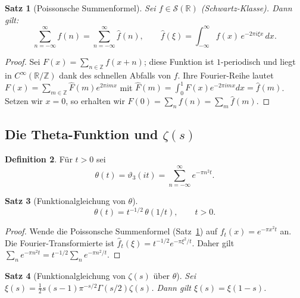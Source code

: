 \documentclass[12pt,a4paper]{amsart}
\newtheorem{theorem}{Satz}[section]
\theoremstyle{definition}
\newtheorem{definition}[theorem]{Definition}
\begin{document}
\begin{theorem}[Poissonsche Summenformel]\label{thm:poisson}
Sei $f \in \mathcal{S}(\mathbb{R})$ (Schwartz-Klasse). Dann gilt:
\[
  \sum_{n=-\infty}^{\infty} f(n) = \sum_{n=-\infty}^{\infty} \hat{f}(n),
  \qquad \hat{f}(\xi) = \int_{-\infty}^{\infty} f(x)\, e^{-2\pi i \xi x}\,dx.
\]
\end{theorem}

\begin{proof}
Sei $F(x) = \sum_{n\in\mathbb{Z}} f(x+n)$; diese Funktion ist $1$-periodisch
und liegt in $C^\infty(\mathbb{R}/\mathbb{Z})$ dank des schnellen Abfalls von $f$.
Ihre Fourier-Reihe lautet $F(x) = \sum_{m\in\mathbb{Z}} \hat{F}(m) e^{2\pi imx}$ mit
$\hat{F}(m) = \int_0^1 F(x) e^{-2\pi imx}dx = \hat{f}(m)$.
Setzen wir $x = 0$, so erhalten wir $F(0) = \sum_n f(n) = \sum_m \hat{f}(m)$.
\end{proof}

\subsection{Die Theta-Funktion und $\zeta(s)$}

\begin{definition}
Für $t > 0$ sei
\[
  \theta(t) = \vartheta_3(it) = \sum_{n=-\infty}^{\infty} e^{-\pi n^2 t}.
\]
\end{definition}

\begin{theorem}[Funktionalgleichung von $\theta$]\label{thm:theta_fe}
\[
  \theta(t) = t^{-1/2}\,\theta(1/t), \qquad t > 0.
\]
\end{theorem}

\begin{proof}
Wende die Poissonsche Summenformel (Satz~\ref{thm:poisson}) auf $f_t(x) = e^{-\pi x^2 t}$ an.
Die Fourier-Transformierte ist $\hat{f}_t(\xi) = t^{-1/2} e^{-\pi\xi^2/t}$.
Daher gilt $\sum_n e^{-\pi n^2 t} = t^{-1/2} \sum_n e^{-\pi n^2/t}$.
\end{proof}

\begin{theorem}[Funktionalgleichung von $\zeta(s)$ über $\theta$]\label{thm:zeta_fe}
Sei $\xi(s) = \tfrac{1}{2}s(s-1)\pi^{-s/2}\Gamma(s/2)\zeta(s)$.  Dann gilt
$\xi(s) = \xi(1-s)$.
\end{theorem}
\end{document}
